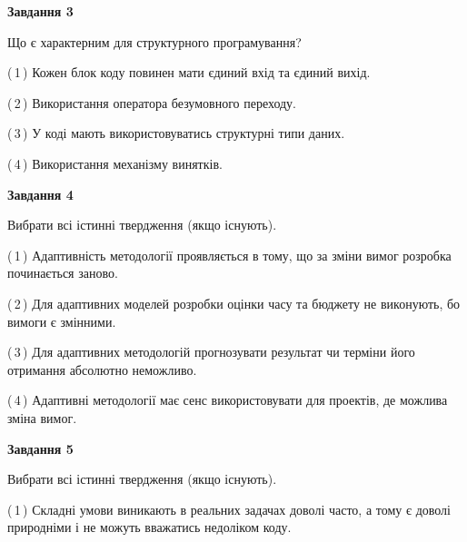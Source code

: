 \documentclass[10pt, ukrainian]{article}
\begin{document}
{\begin {large}
{\begin {center}\textbf{Завдання 3}\end {center}}\par
Що є характерним для структурного програмування?\par
\vspace{2mm}



(\,1\,) Кожен блок коду повинен мати єдиний вхід та єдиний вихід.%



(\,2\,) Використання оператора безумовного переходу. %



(\,3\,) У коді мають використовуватись структурні типи даних. %



(\,4\,) Використання механізму винятків. %


{\begin {center}\textbf{Завдання 4}\end {center}}\par
Вибрати всі істинні твердження (якщо існують).\par
\vspace{2mm}



(\,1\,) Адаптивність методології проявляється в тому, що за зміни вимог розробка починається заново. %



(\,2\,) Для адаптивних моделей розробки оцінки часу та бюджету не виконують, бо вимоги є змінними. %



(\,3\,) Для адаптивних методологій прогнозувати результат чи терміни його отримання абсолютно неможливо. %



(\,4\,) Адаптивні методології має сенс використовувати для проектів, де можлива зміна вимог. %


{\begin {center}\textbf{Завдання 5}\end {center}}\par
Вибрати всі істинні твердження (якщо існують).\par
\vspace{2mm}



(\,1\,) Складні умови виникають в реальних задачах доволі часто, а тому є доволі природніми і не можуть вважатись недоліком коду. %




\end{large}}
\end{document}
